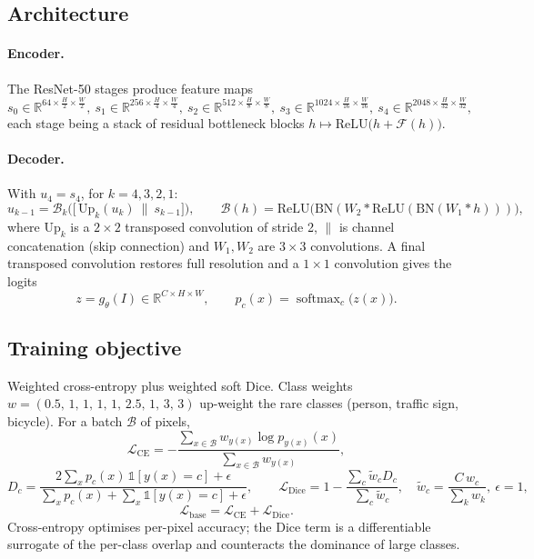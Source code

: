 \documentclass[11pt,a4paper]{article}
\newcommand{\R}{\mathbb{R}}
\newcommand{\1}{\mathbb{1}}
\DeclareMathOperator{\softmax}{softmax}
\begin{document}
\subsection{Architecture}

\paragraph{Encoder.} The ResNet-50 stages produce feature maps
\[
s_0 \in \R^{64\times\frac H2\times\frac W2},\
s_1 \in \R^{256\times\frac H4\times\frac W4},\
s_2 \in \R^{512\times\frac H8\times\frac W8},\
s_3 \in \R^{1024\times\frac H{16}\times\frac W{16}},\
s_4 \in \R^{2048\times\frac H{32}\times\frac W{32}},
\]
each stage being a stack of residual bottleneck blocks
$h \mapsto \mathrm{ReLU}\big(h + \mathcal{F}(h)\big)$.

\paragraph{Decoder.} With $u_4 = s_4$, for $k = 4,3,2,1$:
\[
u_{k-1} = \mathcal{B}_k\Big(\big[\,\mathrm{Up}_k(u_k)\ \big\|\ s_{k-1}\big]\Big),
\qquad
\mathcal{B}(h) = \mathrm{ReLU}\big(\mathrm{BN}(W_2 * \mathrm{ReLU}(\mathrm{BN}(W_1 * h)))\big),
\]
where $\mathrm{Up}_k$ is a $2\times2$ transposed convolution of stride 2,
$\|$ is channel concatenation (skip connection) and $W_1,W_2$ are
$3\times3$ convolutions. A final transposed convolution restores full
resolution and a $1\times1$ convolution gives the logits
\[
z = g_\theta(I) \in \R^{C\times H\times W},
\qquad
p_c(x) = \softmax_c\big(z(x)\big).
\]

\subsection{Training objective}

Weighted cross-entropy plus weighted soft Dice. Class weights
$w = (0.5,\,1,\,1,\,1,\,1,\,2.5,\,1,\,3,\,3)$ up-weight the rare classes
(person, traffic sign, bicycle). For a batch $\mathcal{B}$ of pixels,
\[
\mathcal{L}_{\text{CE}} =
-\frac{\sum_{x\in\mathcal{B}} w_{y(x)}\log p_{y(x)}(x)}
      {\sum_{x\in\mathcal{B}} w_{y(x)}},
\]
\[
D_c = \frac{2\sum_{x} p_c(x)\,\1[y(x)=c] + \epsilon}
           {\sum_{x} p_c(x) + \sum_x \1[y(x)=c] + \epsilon},
\qquad
\mathcal{L}_{\text{Dice}} = 1 - \frac{\sum_c \tilde w_c D_c}{\sum_c \tilde w_c},
\quad
\tilde w_c = \frac{C\,w_c}{\sum_k w_k},\ \epsilon=1,
\]
\[
\mathcal{L}_{\text{base}} = \mathcal{L}_{\text{CE}} + \mathcal{L}_{\text{Dice}} .
\]
Cross-entropy optimises per-pixel accuracy; the Dice term
\cite{milletari2016} is a differentiable surrogate of the per-class overlap
and counteracts the dominance of large classes.
\end{document}
